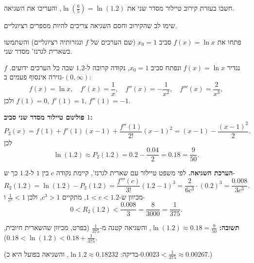 
\begin{question}
חשבו בעזרת קירוב טיילור מסדר שני את $\ln\left(\frac{6}{5}\right) = \ln(1.2)$, והעריכו את השגיאה.

שימו לב שהקירוב וחסם השגיאה צריכים להיות מספרים רציונליים.
\end{question}

\begin{hint}
פתחו את $f(x) = \ln x$ סביב $x_0 = 1$ (שם הערכים של $f$ ונגזרותיה רציונליים) והשתמשו בשארית לגרנז' מסדר שני.
\end{hint}

\begin{solution}
נגדיר $f(x) = \ln x$ ונפתח סביב $x_0 = 1$, נקודה קרובה ל-$1.2$ שבה כל הערכים ידועים. $f$ גזירה אינסוף פעמים ב-$(0,\infty)$:
\[ f(x) = \ln x,\quad f'(x) = \frac{1}{x},\quad f''(x) = -\frac{1}{x^2},\quad f'''(x) = \frac{2}{x^3}, \]
ולכן $f(1) = 0$, $f'(1) = 1$, $f''(1) = -1$.

\textbf{פולינום טיילור מסדר שני סביב $1$:}
\[ P_2(x) = f(1) + f'(1)(x - 1) + \frac{f''(1)}{2!}(x - 1)^2 = (x - 1) - \frac{(x - 1)^2}{2}. \]
לכן
\[ \ln(1.2) \approx P_2(1.2) = 0.2 - \frac{0.04}{2} = 0.18 = \frac{9}{50}. \]

\textbf{הערכת השגיאה.} לפי משפט טיילור עם שארית לגרנז', קיימת נקודה $c$ בין $1$ ל-$1.2$ כך ש-
\[ R_2(1.2) = \ln(1.2) - P_2(1.2) = \frac{f'''(c)}{3!}(1.2 - 1)^3 = \frac{2}{6c^3}\cdot (0.2)^3 = \frac{0.008}{3c^3}. \]
מכיוון ש-$1 < c < 1.2$, מתקיים $c^3 > 1$, ולכן $\frac{1}{c^3} < 1$ ו-
\[ 0 < R_2(1.2) < \frac{0.008}{3} = \frac{8}{3000} = \frac{1}{375}. \]

\textbf{תשובה:} $\ln(1.2) \approx 0.18 = \frac{9}{50}$, והשגיאה קטנה מ-$\frac{1}{375}$ (בפרט, מכיוון שהשארית חיובית, $0.18 < \ln(1.2) < 0.18 + \frac{1}{375}$).

(בדיקה: $\ln 1.2 \approx 0.18232$, והשגיאה בפועל היא כ-$0.0023 < \frac{1}{375} \approx 0.00267$.)
\end{solution}
